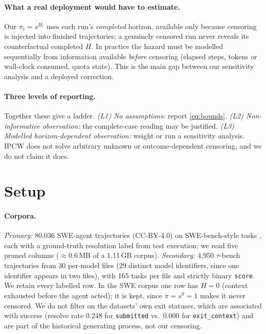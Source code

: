 \documentclass[letterpaper]{article}
\begin{document}
\paragraph{What a real deployment would have to estimate.} Our $\pi_i=s^{H_i}$
uses each run's \emph{completed} horizon, available only because censoring is
injected into finished trajectories; a genuinely censored run never reveals its
counterfactual completed $H$. In practice the hazard must be modelled
sequentially from information available \emph{before} censoring (elapsed steps,
tokens or wall-clock consumed, quota state). This is the main gap between our
sensitivity analysis and a deployed correction.

\paragraph{Three levels of reporting.} Together these give a ladder.
\emph{(L1) No assumptions:} report \eqref{eq:bounds}.
\emph{(L2) Non-informative observation:} the complete-case reading may be
justified. \emph{(L3) Modelled horizon-dependent observation:} weight or run a
sensitivity analysis. IPCW does not solve arbitrary unknown or
outcome-dependent censoring, and we do not claim it does.

\section{Setup}
\label{sec:setup}

\paragraph{Corpora.} \emph{Primary:} 80{,}036 SWE-agent
\citep{yang2024sweagent} trajectories \citep{nebius2024trajectories}
(CC-BY-4.0) on SWE-bench-style tasks
\citep{jimenez2024swebench,openai2024swebenchverified}, each with a
ground-truth resolution label from test execution; we read five pruned columns
($\approx$0.6\,MB of a 1.11\,GB corpus).
\emph{Secondary:} 4{,}950 $\tau$-bench trajectories
\citep{agentsuite2026taubench,yao2025taubench} from 30 per-model files
(29 distinct model identifiers, since one identifier appears in two files), with
165 tasks per file and strictly binary \texttt{score}. We retain every labelled
row. In the SWE corpus one row has $H=0$ (context exhausted before the agent
acted); it is kept, since $\pi=s^{0}=1$ makes it never censored. We do not
filter on the datasets' own exit statuses, which are associated with success
(resolve rate 0.248 for \texttt{submitted} vs.\ 0.000 for
\texttt{exit\_context}) and are part of the historical generating process, not
our censoring.
\end{document}
